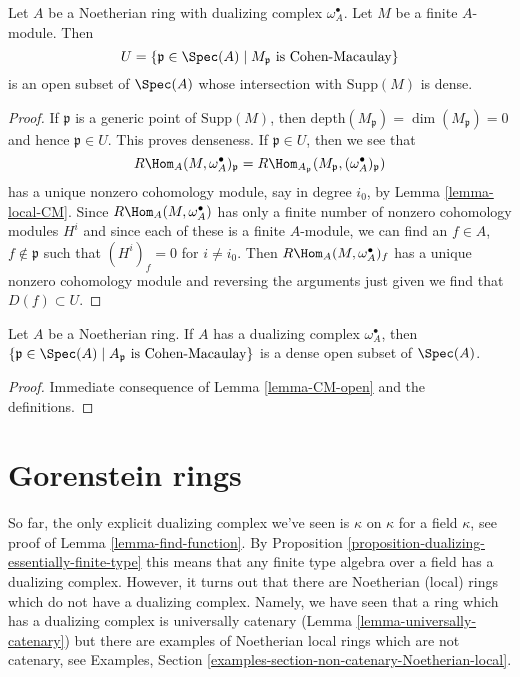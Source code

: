 \begin{lemma}
\label{lemma-CM-open}
Let $A$ be a Noetherian ring with dualizing complex $\omega_A^\bullet$.
Let $M$ be a finite $A$-module. Then
$$
U = \{\mathfrak p \in \Spec(A) \mid M_\mathfrak p\text{ is Cohen-Macaulay}\}
$$
is an open subset of $\Spec(A)$ whose intersection with
$\text{Supp}(M)$ is dense.
\end{lemma}

\begin{proof}
If $\mathfrak p$ is a generic point of $\text{Supp}(M)$, then
$\text{depth}(M_\mathfrak p) = \dim(M_\mathfrak p) = 0$
and hence $\mathfrak p \in U$. This proves denseness.
If $\mathfrak p \in U$, then we see that
$$
R\Hom_A(M, \omega_A^\bullet)_\mathfrak p =
R\Hom_{A_\mathfrak p}(M_\mathfrak p, (\omega_A^\bullet)_\mathfrak p)
$$
has a unique nonzero cohomology module, say in degree $i_0$, by
Lemma \ref{lemma-local-CM}.
Since $R\Hom_A(M, \omega_A^\bullet)$
has only a finite number of nonzero cohomology modules $H^i$
and since each of these is a finite $A$-module, we can
find an $f \in A$, $f \not \in \mathfrak p$ such that
$(H^i)_f = 0$ for $i \not = i_0$. Then
$R\Hom_A(M, \omega_A^\bullet)_f$ has a unique nonzero cohomology
module and reversing the arguments just given we find
that $D(f) \subset U$.
\end{proof}

\begin{lemma}
\label{lemma-CM}
Let $A$ be a Noetherian ring. If $A$ has a dualizing complex
$\omega_A^\bullet$, then
$\{\mathfrak p \in \Spec(A) \mid A_\mathfrak p\text{ is Cohen-Macaulay}\}$
is a dense open subset of $\Spec(A)$.
\end{lemma}

\begin{proof}
Immediate consequence of Lemma \ref{lemma-CM-open} and the definitions.
\end{proof}






\section{Gorenstein rings}
\label{section-gorenstein}

\noindent
So far, the only explicit dualizing complex we've seen is $\kappa$ on $\kappa$
for a field $\kappa$, see proof of Lemma \ref{lemma-find-function}.
By Proposition \ref{proposition-dualizing-essentially-finite-type}
this means that any finite type algebra over a field has a dualizing
complex. However, it turns out that there are Noetherian (local) rings
which do not have a dualizing complex. Namely, we have seen that
a ring which has a dualizing complex is universally catenary
(Lemma \ref{lemma-universally-catenary})
but there are examples of
Noetherian local rings which are not catenary, see
Examples, Section \ref{examples-section-non-catenary-Noetherian-local}.

